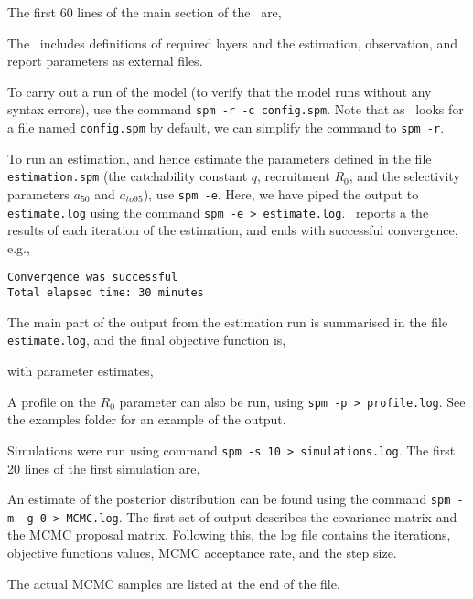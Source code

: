 The first 60 lines of the main section of the \config\ are,
 

The \config\ includes definitions of required layers and the estimation, observation, and report parameters as external files.

To carry out a run of the model (to verify that the model runs without any syntax errors), use the command \texttt{spm -r -c config.spm}. Note that as \SPM\ looks for a file named \texttt{config.spm} by default, we can simplify the command to \texttt{spm -r}. 

To run an estimation, and hence estimate the parameters defined in the file \texttt{estimation.spm} (the catchability constant $q$, recruitment $R_0$, and the selectivity parameters $a_{50}$ and $a_{to95}$), use \texttt{spm -e}. Here, we have piped the output to \texttt{estimate.log} using the command \texttt{spm -e > estimate.log}.  \SPM\ reports a the results of each iteration of the estimation, and ends with successful convergence, e.g., 
{\small{\begin{verbatim}
Convergence was successful
Total elapsed time: 30 minutes
\end{verbatim}}}

The main part of the output from the estimation run is summarised in the file \texttt{estimate.log}, and the final objective function is,
 
with parameter estimates,
 

A profile on the $R_0$ parameter can also be run, using \texttt{spm -p > profile.log}. See the examples folder for an example of the output.

Simulations were run using command \texttt{spm -s 10 > simulations.log}. The first 20 lines of the first simulation are,
 

An estimate of the posterior distribution can be found using the command \texttt{spm -m -g 0 > MCMC.log}. The first set of output describes the covariance matrix and the MCMC proposal matrix. Following this, the log file contains the iterations, objective functions values, MCMC acceptance rate, and the step size.

The actual MCMC samples are listed at the end of the file.


